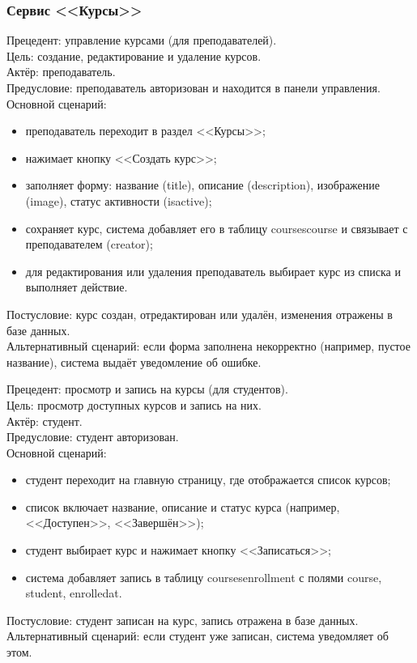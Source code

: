 \subsubsection{Сервис <<Курсы>>}

{Прецедент: управление курсами (для преподавателей)}. \\
{Цель}: создание, редактирование и удаление курсов. \\
{Актёр}: преподаватель. \\
{Предусловие}: преподаватель авторизован и находится в панели управления. \\
{Основной сценарий}:
\begin{itemize}
	\item преподаватель переходит в раздел <<Курсы>>;
	\item нажимает кнопку <<Создать курс>>;
	\item заполняет форму: название (title), описание (description), изображение (image), статус активности (isactive);
	\item сохраняет курс, система добавляет его в таблицу coursescourse и связывает с преподавателем (creator);
	\item для редактирования или удаления преподаватель выбирает курс из списка и выполняет действие.
\end{itemize}
{Постусловие}: курс создан, отредактирован или удалён, изменения отражены в базе данных. \\
{Альтернативный сценарий}: если форма заполнена некорректно (например, пустое название), система выдаёт уведомление об ошибке.

{Прецедент: просмотр и запись на курсы (для студентов)}. \\
{Цель}: просмотр доступных курсов и запись на них. \\
{Актёр}: студент. \\
{Предусловие}: студент авторизован. \\
{Основной сценарий}:
\begin{itemize}
	\item студент переходит на главную страницу, где отображается список курсов;
	\item список включает название, описание и статус курса (например, <<Доступен>>, <<Завершён>>);
	\item студент выбирает курс и нажимает кнопку <<Записаться>>;
	\item система добавляет запись в таблицу coursesenrollment с полями course, student, enrolledat.
\end{itemize}
{Постусловие}: студент записан на курс, запись отражена в базе данных. \\
{Альтернативный сценарий}: если студент уже записан, система уведомляет об этом.

